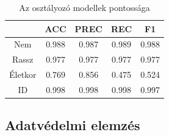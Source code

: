 \begin{table}[ht]
	\centering
	\begin{tabular}{|c|c|c|c|c|}
		\hline
		& ACC & PREC & REC & F1  \\
		\hline
		\hline
		Nem & 0.988 & 0.987 & 0.989 & 0.988 \\
		\hline
		Rassz & 0.977 & 0.977 & 0.977 & 0.977 \\
		\hline
		Életkor & 0.769 & 0.856 & 0.475 & 0.524 \\
		\hline
		ID & 0.998 & 0.998 & 0.998 & 0.997 \\
		\hline
	\end{tabular}
	\caption{Az osztályozó modellek pontossága}
	\label{tab:pontossagok}
\end{table}
 
\subsection{Adatvédelmi elemzés}  %
\label{sec:adatvedelmi_elemz}







